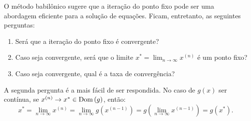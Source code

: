 
O método babilônico sugere que a iteração do ponto fixo pode ser uma abordagem eficiente para a solução de equações. Ficam, entretanto, as seguintes perguntas:
\begin{enumerate}
\item Será que a iteração do ponto fixo é convergente?
\item Caso seja convergente, será que o limite $x^* = \lim_{n\to \infty }x^{(n)}$ é um ponto fixo?
\item Caso seja convergente, qual é a taxa de convergência?
\end{enumerate}

A segunda pergunta é a mais fácil de ser respondida. No caso de $g(x)$ ser contínua, se $x^{(n)}\to x^*\in\operatorname{Dom}\,(g)$, então:
\begin{equation*}
  x^* = \lim_{n\to\infty} x^{(n)} = \lim_{n\to\infty} g(x^{(n-1)}) = g\left(\lim_{n\to\infty} x^{(n-1)}\right) = g(x^*).
\end{equation*}



